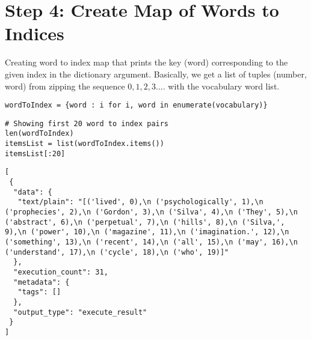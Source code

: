\documentclass[
]{article}
\begin{document}
\hypertarget{step-4-create-map-of-words-to-indices}{%
\section{Step 4: Create Map of Words to
Indices}\label{step-4-create-map-of-words-to-indices}}

Creating word to index map that prints the key (word) corresponding to
the given index in the dictionary argument. Basically, we get a list of
tuples (number, word) from zipping the sequence \(0,1,2,3 ....\) with
the vocabulary word list.

\begin{verbatim}
wordToIndex = {word : i for i, word in enumerate(vocabulary)}
\end{verbatim}

\begin{verbatim}
# Showing first 20 word to index pairs
len(wordToIndex)
itemsList = list(wordToIndex.items())
itemsList[:20]
\end{verbatim}

\begin{verbatim}
[
 {
  "data": {
   "text/plain": "[('lived', 0),\n ('psychologically', 1),\n ('prophecies', 2),\n ('Gordon', 3),\n ('Silva', 4),\n ('They', 5),\n ('abstract', 6),\n ('perpetual', 7),\n ('hills', 8),\n ('Silva,', 9),\n ('power', 10),\n ('magazine', 11),\n ('imagination.', 12),\n ('something', 13),\n ('recent', 14),\n ('all', 15),\n ('may', 16),\n ('understand', 17),\n ('cycle', 18),\n ('who', 19)]"
  },
  "execution_count": 31,
  "metadata": {
   "tags": []
  },
  "output_type": "execute_result"
 }
]
\end{verbatim}
\end{document}
